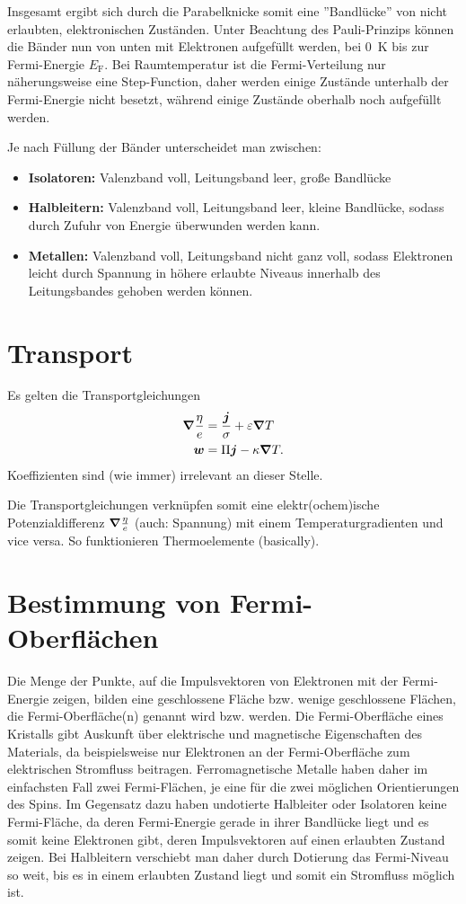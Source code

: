 Insgesamt ergibt sich durch die Parabelknicke somit eine ''Bandlücke'' von nicht erlaubten, elektronischen Zuständen.
Unter Beachtung des Pauli-Prinzips können die Bänder nun von unten mit Elektronen aufgefüllt werden, bei \SI{0}{\kelvin} bis zur Fermi-Energie $E_\text{F}$.
Bei Raumtemperatur ist die Fermi-Verteilung nur näherungsweise eine Step-Function, daher werden einige Zustände unterhalb der Fermi-Energie nicht besetzt, während einige Zustände oberhalb noch aufgefüllt werden.

Je nach Füllung der Bänder unterscheidet man zwischen:
\begin{itemize}
	\item \textbf{Isolatoren:} Valenzband voll, Leitungsband leer, große Bandlücke
	\item \textbf{Halbleitern:} Valenzband voll, Leitungsband leer, kleine Bandlücke, sodass durch Zufuhr von Energie überwunden werden kann.
	\item \textbf{Metallen:} Valenzband voll, Leitungsband nicht ganz voll, sodass Elektronen leicht durch Spannung in höhere erlaubte Niveaus innerhalb des Leitungsbandes gehoben werden können.
\end{itemize}

\section{Transport}
Es gelten die Transportgleichungen
\begin{align*}
	\grad\frac{\eta}{e} &= \frac{\boldsymbol{j}}{\sigma} + \varepsilon\grad T \\
	\boldsymbol{w} &= \Pi\boldsymbol{j} - \kappa\grad T.
\end{align*}
Koeffizienten sind (wie immer) irrelevant an dieser Stelle.

Die Transportgleichungen verknüpfen somit eine elektr(ochem)ische Potenzialdifferenz $\grad\frac{\eta}{e}$ (auch: Spannung) mit einem Temperaturgradienten und vice versa.
So funktionieren Thermoelemente (basically).

\section{Bestimmung von Fermi-Oberflächen}
Die Menge der Punkte, auf die Impulsvektoren von Elektronen mit der Fermi-Energie zeigen, bilden eine geschlossene Fläche bzw. wenige geschlossene Flächen, die Fermi-Oberfläche(n) genannt wird bzw. werden.
Die Fermi-Oberfläche eines Kristalls gibt Auskunft über elektrische und magnetische Eigenschaften des Materials, da beispielsweise nur Elektronen an der Fermi-Oberfläche zum elektrischen Stromfluss beitragen.
Ferromagnetische Metalle haben daher im einfachsten Fall zwei Fermi-Flächen, je eine für die zwei möglichen Orientierungen des Spins.
Im Gegensatz dazu haben undotierte Halbleiter oder Isolatoren keine Fermi-Fläche, da deren Fermi-Energie gerade in ihrer Bandlücke liegt und es somit keine Elektronen gibt, deren Impulsvektoren auf einen erlaubten Zustand zeigen.
Bei Halbleitern verschiebt man daher durch Dotierung das Fermi-Niveau so weit, bis es in einem erlaubten Zustand liegt und somit ein Stromfluss möglich ist.

